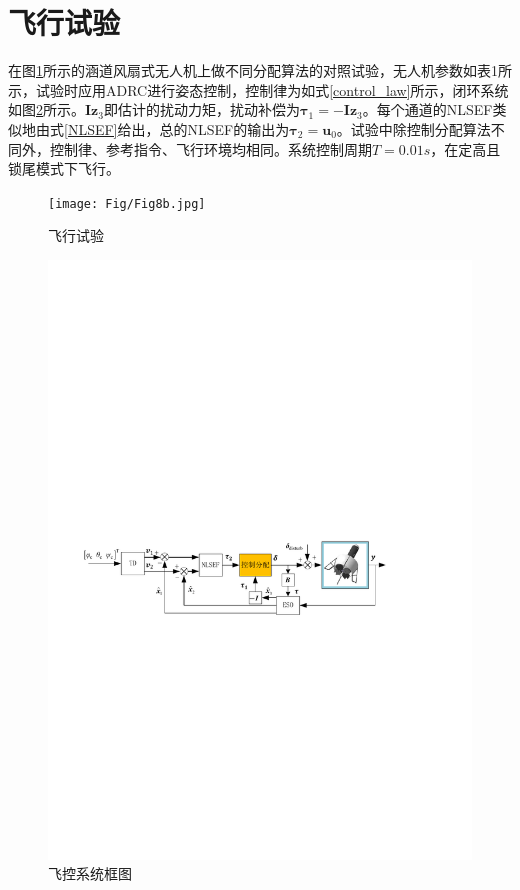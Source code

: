 \section{飞行试验}
在图\ref{fig_flight}所示的涵道风扇式无人机上做不同分配算法的对照试验，无人机参数如表1所示，试验时应用ADRC进行姿态控制，控制律为如式\eqref{control_law}所示，闭环系统如图\ref{fig_flight_control_system}所示。$\bm{I}\bm{z}_3$即估计的扰动力矩，扰动补偿为$\bm{\tau}_1=-\bm{I}\bm{z}_3$。每个通道的NLSEF类似地由式\eqref{NLSEF}给出，总的NLSEF的输出为$\bm{\tau}_2=\bm{u}_0$。试验中除控制分配算法不同外，控制律、参考指令、飞行环境均相同。系统控制周期$T=0.01s$，在定高且锁尾模式下飞行。
\begin{figure}[htbp]
	\centering	
	\texttt{[image: Fig/Fig8b.jpg]}
	\caption{\label{fig_flight}飞行试验}
\end{figure}
\begin{figure}[htbp]
	\centering	
	\includegraphics[scale=0.9]{Fig/Fig9.pdf}
	\caption{\label{fig_flight_control_system}飞控系统框图}
\end{figure}

